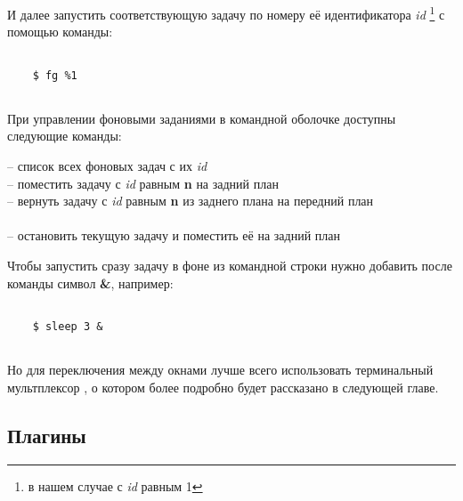 И далее запустить соответствующую задачу по номеру её идентификатора \textit{id} \footnote{в нашем случае с \textit{id} равным 1} с помощью команды:
\begin{lstlisting}
	
	$ fg %1
	
\end{lstlisting}	

При управлении фоновыми заданиями в командной оболочке  доступны следующие команды:

\noindent
{} -- список всех фоновых задач с их \textit{id}\\
 -- поместить задачу с \textit{id} равным \textbf{n} на задний план\\
 -- вернуть задачу с \textit{id} равным \textbf{n} из заднего плана на передний план\\
\\
 -- остановить текущую задачу и поместить её на задний план

Чтобы запустить сразу задачу в фоне из командной строки нужно добавить после команды символ \textbf{\&}, например:
\begin{lstlisting}
	
	$ sleep 3 &
	
\end{lstlisting}	

Но для переключения между окнами лучше всего использовать терминальный мультплексор , о котором более подробно будет рассказано в следующей главе.

\subsection*{Плагины}
